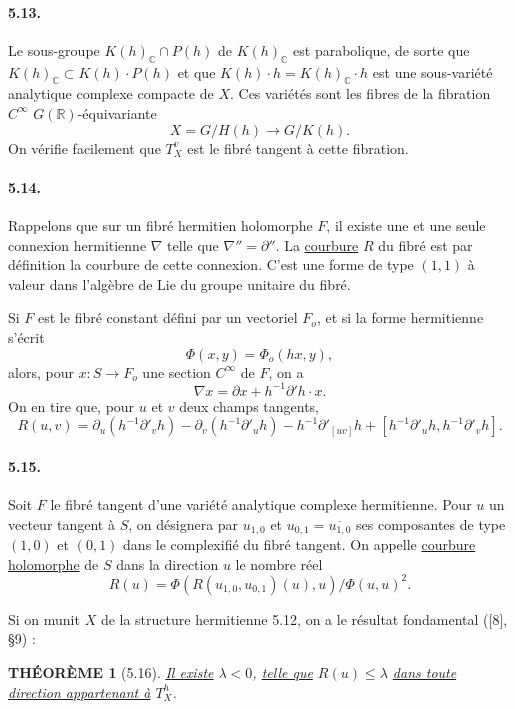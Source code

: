 \documentclass[10pt,leqno]{article}
\newcommand{\C}{\mathbb C}
\newcommand{\R}{\mathbb R}
\theoremstyle{deligne}
\newtheorem*{theoreme}{THÉORÈME}
\renewcommand{\underline}[1]{\uline{#1}}
\begin{document}
\paragraph{5.13.}
Le sous-groupe $K(h)_\C\cap P(h)$ de $K(h)_\C$ est parabolique, de sorte que $K(h)_\C\subset K(h)\cdot P(h)$ et que $K(h)\cdot h=K(h)_\C\cdot h$ est une sous-variété analytique complexe compacte de $X$. Ces variétés sont les fibres de la fibration $C^\infty$ $G(\R)$-équivariante
\[
  X=G/H(h)\longrightarrow G/K(h).
\]
On vérifie facilement que $T_X^v$ est le fibré tangent à cette fibration.

\paragraph{5.14.}
Rappelons que sur un fibré hermitien holomorphe $F$, il existe une et une seule connexion hermitienne $\nabla$ telle que $\nabla''=\partial''$. La \underline{courbure} $R$ du fibré est par définition la courbure de cette connexion. C'est une forme de type $(1,1)$ à valeur dans l'algèbre de Lie du groupe unitaire du fibré.

Si $F$ est le fibré constant défini par un vectoriel $F_o$, et si la forme hermitienne s'écrit
\[
\tag{5.14.1}
  \Phi(x,y)=\Phi_o(hx,y),
\]
alors, pour $x:S\to F_o$ une section $C^\infty$ de $F$, on a
\[
\tag{5.14.2}
  \nabla x=\partial x+h^{-1}\partial' h\cdot x.
\]
On en tire que, pour $u$ et $v$ deux champs tangents,
\[
\tag{5.14.3}
  R(u,v)=
  \partial_u(h^{-1}\partial'_v h)
  -\partial_v(h^{-1}\partial'_u h)
  -h^{-1}\partial'_{[uv]}h
  +[h^{-1}\partial'_u h,h^{-1}\partial'_v h].
\]

\paragraph{5.15.}
Soit $F$ le fibré tangent d'une variété analytique complexe hermitienne. Pour $u$ un vecteur tangent à $S$, on désignera par $u_{1,0}$ et $u_{0,1}=\overline{u_{1,0}}$ ses composantes de type $(1,0)$ et $(0,1)$ dans le complexifié du fibré tangent. On appelle \underline{courbure holomorphe} de $S$ dans la direction $u$ le nombre réel
\[
\tag{5.15.1}
  R(u)=
  \Phi(R(u_{1,0},u_{0,1})(u),u)/\Phi(u,u)^2.
\]

Si on munit $X$ de la structure hermitienne 5.12, on a le résultat fondamental ([8], §9) :

\begin{theoreme}[5.16]
\underline{Il existe} $\lambda<0$, \underline{telle que} $R(u)\le\lambda$ \underline{dans toute direction appartenant à} $T_X^h$.
\end{theoreme}
\end{document}
